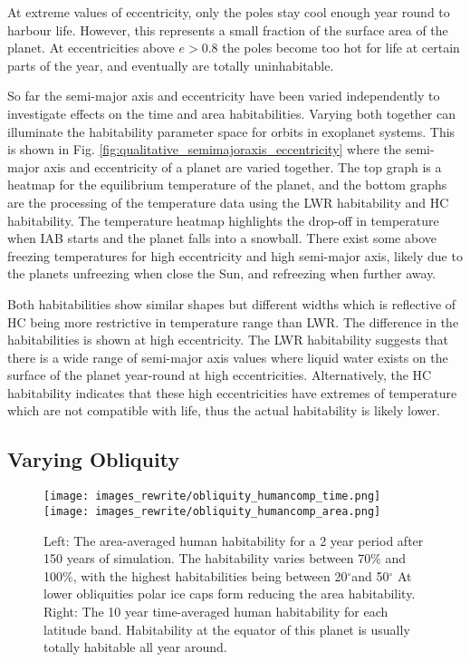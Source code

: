 \documentclass[12pt, onecolumn]{revtex4-2}    %
\newcommand{\degrees}{\ensuremath{^{\circ}}}
\begin{document}
At extreme values of eccentricity, only the poles stay cool enough year round to harbour life.
However, this represents a small fraction of the surface area of the planet.
At eccentricities above $e > 0.8$ the poles become too hot for life at certain parts of the year, and eventually are totally uninhabitable.


So far the semi-major axis and eccentricity have been varied independently to investigate effects on the time and area habitabilities.
Varying both together can illuminate the habitability parameter space for orbits in exoplanet systems.
This is shown in Fig. \ref{fig:qualitative_semimajoraxis_eccentricity} where the semi-major axis and eccentricity of a planet are varied together.
The top graph is a heatmap for the equilibrium temperature of the planet, and the bottom graphs are the processing of the temperature data using the LWR habitability and HC habitability.
The temperature heatmap highlights the drop-off in temperature when IAB starts and the planet falls into a snowball.
There exist some above freezing temperatures for high eccentricity and high semi-major axis, likely due to the planets unfreezing when close the Sun, and refreezing when further away.

Both habitabilities show similar shapes but different widths which is reflective of HC being more restrictive in temperature range than LWR.
The difference in the habitabilities is shown at high eccentricity.
The LWR habitability suggests that there is a wide range of semi-major axis values where liquid water exists on the surface of the planet year-round at high eccentricities.
Alternatively, the HC habitability indicates that these high eccentricities have extremes of temperature which are not compatible with life, thus the actual habitability is likely lower.

\subsection{Varying Obliquity} \label{ssec:qualitative_obliquity}
%
\begin{figure}[t]
  \texttt{[image: images\_rewrite/obliquity\_humancomp\_time.png]}
  \texttt{[image: images\_rewrite/obliquity\_humancomp\_area.png]}
  \caption{
    Left: The area-averaged human habitability for a 2 year period after 150 years of simulation.
    The habitability varies between 70\% and 100\%, with the highest habitabilities being between 20\degrees and 50\degrees
    At lower obliquities polar ice caps form reducing the area habitability.
    Right: The 10 year time-averaged human habitability for each latitude band.
    Habitability at the equator of this planet is usually totally habitable all year around.
  }
  \label{fig:qualitative_obliquity}
\end{figure}
\end{document}
